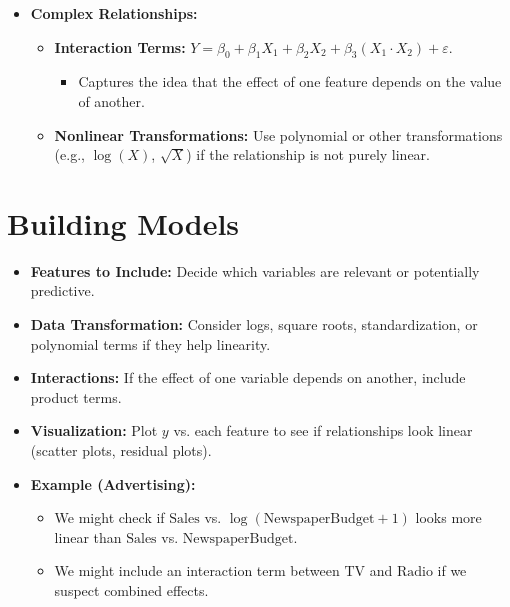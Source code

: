 \documentclass[10pt]{article}
\begin{document}
\begin{itemize}
\begin{itemize}
    \end{itemize}
    \item \textbf{Complex Relationships:}
    \begin{itemize}
        \item \textbf{Interaction Terms:} \(Y = \beta_{0} + \beta_{1} X_{1} + \beta_{2} X_{2} + \beta_{3}(X_{1}\cdot X_{2}) + \varepsilon\).
        \begin{itemize}
            \item Captures the idea that the effect of one feature depends on the value of another.
        \end{itemize}
        \item \textbf{Nonlinear Transformations:} Use polynomial or other transformations (e.g., \(\log(X)\), \(\sqrt{X}\)) if the relationship is not purely linear.
    \end{itemize}
\end{itemize}

\section{Building Models}
\begin{itemize}
    \item \textbf{Features to Include:} Decide which variables are relevant or potentially predictive.
    \item \textbf{Data Transformation:} Consider logs, square roots, standardization, or polynomial terms if they help linearity.
    \item \textbf{Interactions:} If the effect of one variable depends on another, include product terms.
    \item \textbf{Visualization:} Plot \(y\) vs. each feature to see if relationships look linear (scatter plots, residual plots).
    \item \textbf{Example (Advertising):}
    \begin{itemize}
        \item We might check if \(\text{Sales}\) vs. \(\log(\text{NewspaperBudget}+1)\) looks more linear than \(\text{Sales}\) vs. \(\text{NewspaperBudget}\).
        \item We might include an interaction term between \(\text{TV}\) and \(\text{Radio}\) if we suspect combined effects.
    \end{itemize}
\end{itemize}
\end{document}
